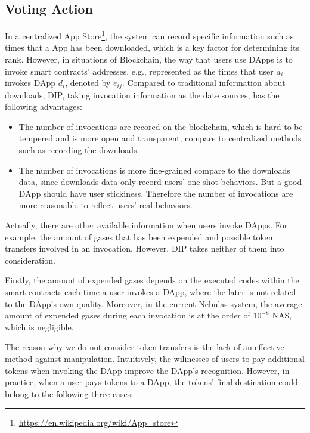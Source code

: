  \subsection{Voting Action}
 \label{subsection:voting}
  In a centralized App Store\footnote{\url{https://en.wikipedia.org/wiki/App\_store}}, the system can record specific information such as times that a App has been downloaded, which is a key factor for determining its rank. However, in situations of Blockchain, the way that users use DApps is to invoke smart contracts' addresses, e.g., represented as the times that user $a_i$ invokes DApp $d_i$, denoted by  $e_{ij}$. Compared to traditional information about downloads, DIP, taking invocation information as the date sources, has the following advantages:

 \begin{itemize}
 	\item The number of invocations are recored on the blockchain, which is hard to be tempered and is more open and transparent, compare to centralized methods such as recording the downloads.
 	\item The number of invocations is more fine-grained compare to the downloads data, since downloads data only record users' one-shot behaviors. But a good DApp should have user stickiness. Therefore the number of invocations are more reasonable to reflect users' real behaviors.

\end{itemize}

 Actually, there are other available information when users invoke DApps. For example, the amount of gases that has been expended and possible token transfers involved in an invocation. However, DIP takes neither of them into consideration.

 Firstly, the amount of expended gases depends on the executed codes within the smart contracts each time a user invokes a DApp, where the later is not related to the DApp's own quality. Moreover, in the current Nebulas system, the average amount of expended gases during each invocation is at the order of $10^{-8}$ NAS, which is negligible.

 The reason why we do not consider token transfers is the lack of an effective method against manipulation. Intuitively, the wilinesses of users to pay additional tokens when invoking the DApp improve the DApp's recognition.
  However, in practice, when a user pays tokens to a DApp, the tokens' final destination could belong to the following three cases:

